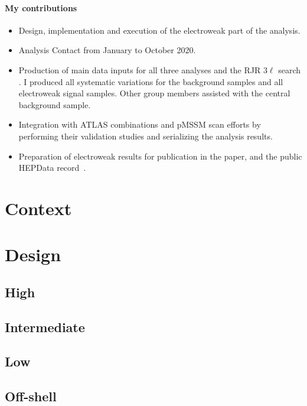 \paragraph{My contributions}
\begin{itemize}
\item Design, implementation and execution of the electroweak part of the analysis.
\item Analysis Contact from January to October 2020.
\item Production of main data inputs for all three analyses
and the RJR $3\ell$ search .
I produced all systematic variations for the background samples and all
electroweak signal samples.
Other group members assisted with the central background sample.
\item Integration with ATLAS combinations and pMSSM scan efforts by
performing their validation studies and serializing the analysis results.
\item Preparation of electroweak results for publication in the paper, and the
public HEPData record~\cite{maguire2017hepdata}.
\end{itemize}

\section{Context}

\section{Design}

\subsection{High}

\subsection{Intermediate}

\subsection{Low}

\subsection{Off-shell}

